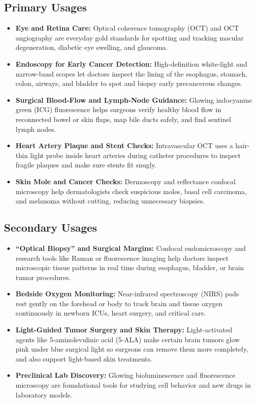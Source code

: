 \subsection{Primary Usages}
\begin{itemize}
  \item \textbf{Eye and Retina Care:} Optical coherence tomography (OCT) and OCT angiography are everyday gold standards for spotting and tracking macular degeneration, diabetic eye swelling, and glaucoma.
  \item \textbf{Endoscopy for Early Cancer Detection:} High-definition white-light and narrow-band scopes let doctors inspect the lining of the esophagus, stomach, colon, airways, and bladder to spot and biopsy early precancerous changes.
  \item \textbf{Surgical Blood-Flow and Lymph-Node Guidance:} Glowing indocyanine green (ICG) fluorescence helps surgeons verify healthy blood flow in reconnected bowel or skin flaps, map bile ducts safely, and find sentinel lymph nodes.
  \item \textbf{Heart Artery Plaque and Stent Checks:} Intravascular OCT uses a hair-thin light probe inside heart arteries during catheter procedures to inspect fragile plaques and make sure stents fit snugly.
  \item \textbf{Skin Mole and Cancer Checks:} Dermoscopy and reflectance confocal microscopy help dermatologists check suspicious moles, basal cell carcinoma, and melanoma without cutting, reducing unnecessary biopsies.
\end{itemize}

\subsection{Secondary Usages}
\begin{itemize}
  \item \textbf{``Optical Biopsy'' and Surgical Margins:} Confocal endomicroscopy and research tools like Raman or fluorescence imaging help doctors inspect microscopic tissue patterns in real time during esophagus, bladder, or brain tumor procedures.
  \item \textbf{Bedside Oxygen Monitoring:} Near-infrared spectroscopy (NIRS) pads rest gently on the forehead or body to track brain and tissue oxygen continuously in newborn ICUs, heart surgery, and critical care.
  \item \textbf{Light-Guided Tumor Surgery and Skin Therapy:} Light-activated agents like 5-aminolevulinic acid (5-ALA) make certain brain tumors glow pink under blue surgical light so surgeons can remove them more completely, and also support light-based skin treatments.
  \item \textbf{Preclinical Lab Discovery:} Glowing bioluminescence and fluorescence microscopy are foundational tools for studying cell behavior and new drugs in laboratory models.
\end{itemize}

